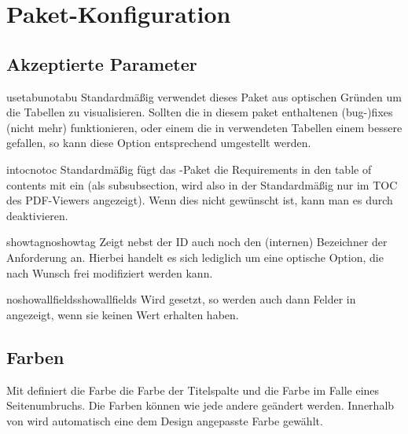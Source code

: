 \documentclass{sopra-base}
\begin{document}
\section{Paket-Konfiguration}    
    \subsection{Akzeptierte Parameter}

\begin{argument}{usetabu}{notabu}
    Standardmäßig verwendet dieses Paket aus optischen Gründen  um die Tabellen zu visualisieren. Sollten die in diesem paket enthaltenen (bug-)fixes (nicht mehr) funktionieren, oder einem die in  verwendeten  Tabellen einem
    bessere gefallen, so kann diese Option entsprechend umgestellt werden. 
\end{argument}

\begin{argument}{intoc}{notoc}
    Standardmäßig fügt das -Paket die Requirements in den table of contents mit ein (als subsubsection, wird also in der Standardmäßig nur im TOC des PDF-Viewers angezeigt). Wenn dies nicht gewünscht ist, kann man es durch  deaktivieren.
\end{argument}

\begin{argument}{showtag}{noshowtag}
    Zeigt nebst der ID auch noch den (internen) Bezeichner der Anforderung an. Hierbei handelt es sich lediglich um eine optische Option, die nach Wunsch frei modifiziert werden kann.
\end{argument}

\begin{argument}{noshowallfields}{showallfields}
    Wird  gesetzt, so werden auch dann Felder in  angezeigt, wenn sie keinen Wert erhalten haben.
\end{argument}

\subsection{Farben}

Mit  definiert die Farbe  die Farbe der Titelspalte und  die Farbe im Falle eines Seitenumbruchs. Die Farben können wie jede andere geändert werden. Innerhalb von  wird automatisch eine dem Design angepasste Farbe gewählt.

%
%
%
%
\end{document}
